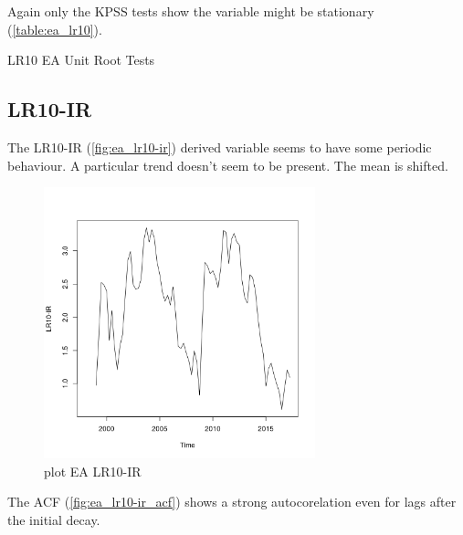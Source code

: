 \documentclass[10pt]{article}
\begin{document}
Again only the KPSS tests show the variable might be stationary (\autoref{table:ea_lr10}).

\begin{table}[h!]
\centering
{}
\caption{LR10 EA Unit Root Tests}
\label{table:ea_lr10}
\end{table}



\subsection{LR10-IR}

The LR10-IR (\autoref{fig:ea_lr10-ir}) derived variable seems to have some periodic behaviour. A particular trend doesn't seem to be present. The mean is shifted.

\begin{figure}[h!]
\centering
\includegraphics[width = 0.7\textwidth]{../plots/ea_LR10-IR}
\caption{plot EA LR10-IR}
\label{fig:ea_lr10-ir}
\end{figure}

The ACF (\autoref{fig:ea_lr10-ir_acf}) shows a strong autocorelation even for lags after the initial decay. 
\end{document}
